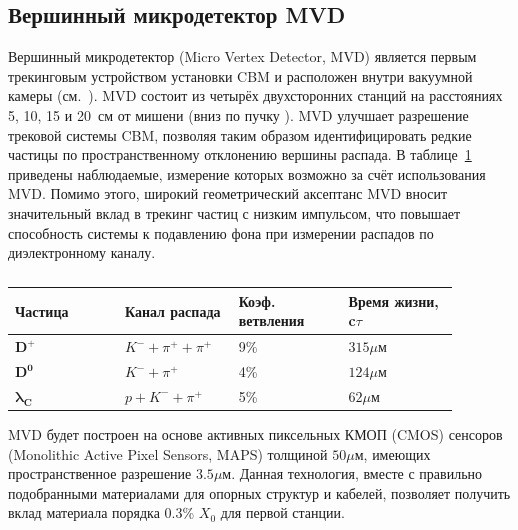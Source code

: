 \subsection{Вершинный микродетектор MVD}\label{sec:secMVD}

Вершинный микродетектор (Micro Vertex Detector, MVD) является первым трекинговым устройством установки CBM и расположен внутри вакуумной камеры (см.~). MVD состоит из четырёх двухсторонних станций на расстояниях 5, 10, 15 и 20~см от мишени (вниз по пучку \todo).
MVD улучшает разрешение трековой системы CBM, позволяя таким образом идентифицировать редкие частицы по пространственному отклонению вершины распада. В таблице~\ref{tabl:MVDphys} приведены наблюдаемые, измерение которых возможно за счёт использования MVD.
Помимо этого, широкий геометрический аксептанс MVD вносит значительный вклад в трекинг частиц с низким импульсом, что повышает способность системы к подавлению фона при измерении распадов по диэлектронному каналу.

\begin{table}[H]
\caption{}
\label{tabl:MVDphys}
\begin{tabular}{ | p{0.22\linewidth} | p{0.22\linewidth} | p{0.22\linewidth} | p{0.22\linewidth} | }
\hline
\textbf{Частица} & \textbf{Канал} \newline \textbf{распада} & \textbf{Коэф.} \newline \textbf{ветвления} & \textbf{Время жизни, c$\tau$} \\
\hline
$\mathbf{D^{+}}$ & $K^{-} + \pi^{+} + \pi^{+}$ & 9\% & $315 \mu$м \\
\hline
$\mathbf{D^{0}}$ & $K^{-} + \pi^{+}$ & 4\% & $124 \mu$м \\
\hline
$\mathbf{\lambda_{C}}$ & $p + K^{-} + \pi^{+}$ & 5\% & $62 \mu$м \\
\hline
\end{tabular}
\end{table}

MVD будет построен на основе активных пиксельных КМОП (CMOS) сенсоров (Monolithic Active Pixel Sensors, MAPS) толщиной $50 \mu$м, имеющих пространственное разрешение $3.5 \mu$м. Данная технология, вместе с правильно подобранными материалами для опорных структур и кабелей, позволяет получить вклад материала порядка 0.3\% $X_{0}$ для первой станции.


